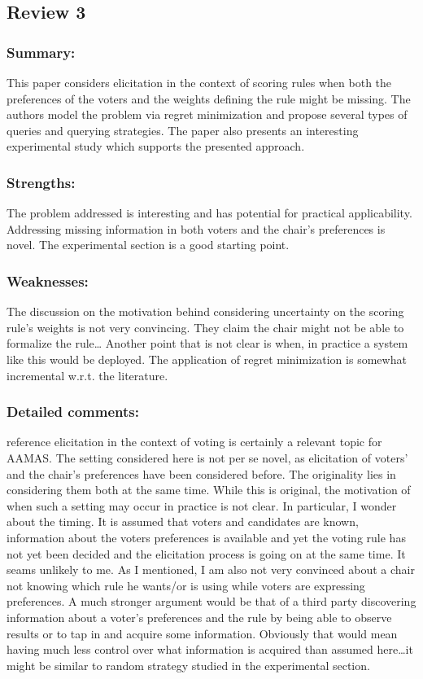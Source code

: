 \documentclass[version=3.21, pagesize, twoside=off, bibliography=totoc, DIV=calc, fontsize=12pt, a4paper]{scrartcl}
\begin{document}
\subsection*{Review 3}
\subsubsection*{Summary:}
This paper considers elicitation in the context of scoring rules when both the preferences of the voters and the weights defining the rule might be missing. The authors model the problem via regret minimization and propose several types of queries and querying strategies. The paper also presents an interesting experimental study which supports the presented approach.
\subsubsection*{Strengths:}	The problem addressed is interesting and has potential for practical applicability.
Addressing missing information in both voters and the chair’s preferences is novel. The experimental section is a good starting point.
\subsubsection*{Weaknesses:}	The discussion on the motivation behind considering uncertainty on the scoring rule’s weights is not very convincing. They claim the chair might not be able to formalize the rule…
Another point that is not clear is when, in practice a system like this would be deployed.
The application of regret minimization is somewhat incremental w.r.t. the literature.

\subsubsection*{Detailed comments:}	reference elicitation in the context of voting is certainly a relevant topic for AAMAS.
The setting considered here is not per se novel, as elicitation of voters’ and the chair’s preferences have been considered before. The originality lies in considering them both at the same time.
While this is original, the motivation of when such a setting may occur in practice is not clear. In particular, I wonder about the timing. It is assumed that voters and candidates are known, information about the voters preferences is available and yet the voting rule has not yet been decided and the elicitation process is going on at the same time. It seams unlikely to me.
As I mentioned, I am also not very convinced about a chair not knowing which rule he wants/or is using while voters are expressing preferences. A much stronger argument would be that of a third party discovering information about a voter’s preferences and the rule by being able to observe results or to tap in and acquire some information. Obviously that would mean having much less control over what information is acquired than assumed here…it might be similar to random strategy studied in the experimental section.
\end{document}
